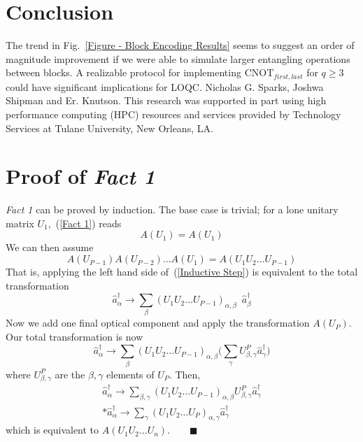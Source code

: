 \documentclass[aps,pra,twocolumn,showpacs,superscriptaddress,floatfix,10pt]{revtex4}
\begin{document}
\section{Conclusion}
\label{Section Conclusion}
 The trend in Fig.~\ref{Figure - Block Encoding Results} seems to suggest an order of magnitude improvement if we were able to simulate larger entangling operations between blocks. A realizable protocol for implementing $\mbox{CNOT}_{first,last}$ for $q \ge 3$ could have significant implications for LOQC.
\acknowledgments
Nicholas G. Sparks, Joshwa Shipman and Er. Knutson. This research was supported in part using high performance computing (HPC) resources and services provided by Technology Services at Tulane University, New Orleans, LA.
\appendix
\section{Proof of \textit{Fact 1}}
\label{Proof of Fact 1}
\textit{Fact 1} can be proved by induction. The base case is trivial; for a lone unitary matrix $U_1$,~(\ref{Fact 1}) reads
\begin{equation}
	A(U_1) = A(U_1)
\end{equation}
We can then assume
\begin{equation}
\label{Inductive Step}
	A(U_{P-1}) A(U_{P-2}) \dots A(U_1) = A(U_1 U_2 \dots U_{P-1})
\end{equation}
That is, applying the left hand side of~(\ref{Inductive Step}) is equivalent to the total transformation
\begin{equation}
	\hat{a}^\dagger_\alpha \rightarrow \sum_\beta (U_1 U_2 \dots U_{P-1})_{\alpha,\beta} \enspace \hat{a}^\dagger_\beta
\end{equation}
Now we add one final optical component and apply the transformation $A(U_P)$. Our total transformation is now
\begin{equation}
	\hat{a}^\dagger_\alpha \rightarrow \sum_\beta (U_1 U_2 \dots U_{P-1})_{\alpha,\beta} \Big(\sum_\gamma U_{\beta,\gamma}^P \hat{a}^\dagger_\gamma \Big)
\end{equation}
where $U_{\beta,\gamma}^P$ are the $\beta,\gamma$ elements of $U_P$. Then,
\begin{eqnarray}
\hat{a}^\dagger_\alpha \rightarrow \sum_{\beta,\gamma} (U_1 U_2 \dots U_{P-1})_{\alpha,\beta} U^P_{\beta,\gamma} \hat{a}^\dagger_\gamma
\\*
\hat{a}^\dagger_\alpha \rightarrow \sum_\gamma (U_1 U_2 \dots U_P)_{\alpha,\gamma} \hat{a}^\dagger_\gamma \quad
\end{eqnarray}
which is equivalent to $A(U_1 U_2 \dots U_n). \quad \quad\blacksquare $
\end{document}
